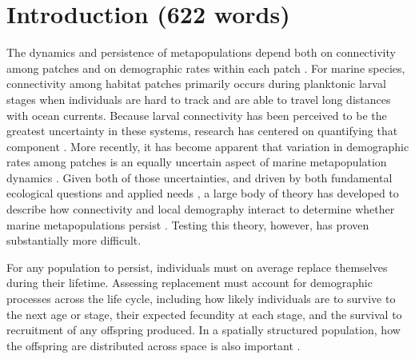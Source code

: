 \documentclass[12pt, oneside]{article}   	%
\begin{document}

\linenumbers{}
\modulolinenumbers[3]

\section*{Introduction (622 words)} 

The dynamics and persistence of metapopulations depend both on connectivity among patches and on demographic rates within each patch \citep{hastings_persistence_2006, hanski1998metapopulation}. For marine species, connectivity among habitat patches primarily occurs during planktonic larval stages when individuals are hard to track and are able to travel long distances with ocean currents. Because larval connectivity has been perceived to be the greatest uncertainty in these systems, research has centered on quantifying that component \citep[reviewed by][]{white2019connectivity}. More recently, it has become apparent that variation in demographic rates among patches is an equally uncertain aspect of marine metapopulation dynamics \citep{hameed2016inverse, white2011oceanographic}. Given both of those uncertainties, and driven by both fundamental ecological questions and applied needs \citep{botsford_dependence_2001,white_population_2010}, a large body of theory has developed to describe how connectivity and local demography interact to determine whether marine metapopulations persist \citep{burgess2014beyond, botsford2019population}. Testing this theory, however, has proven substantially more difficult.

For any population to persist, individuals must on average replace themselves during their lifetime. Assessing replacement must account for demographic processes across the life cycle, including how likely individuals are to survive to the next age or stage, their expected fecundity at each stage, and the survival to recruitment of any offspring produced. In a spatially structured population, how the offspring are distributed across space is also important \citep{hastings_persistence_2006}. %
\end{document}
